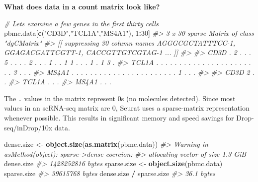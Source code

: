 \documentclass[
]{book}
\newenvironment{Shaded}{\begin{snugshade}}{\end{snugshade}}
\newcommand{\CommentTok}[1]{\textcolor[rgb]{0.56,0.35,0.01}{\textit{#1}}}
\newcommand{\DecValTok}[1]{\textcolor[rgb]{0.00,0.00,0.81}{#1}}
\newcommand{\FunctionTok}[1]{\textcolor[rgb]{0.13,0.29,0.53}{\textbf{#1}}}
\newcommand{\NormalTok}[1]{#1}
\newcommand{\OtherTok}[1]{\textcolor[rgb]{0.56,0.35,0.01}{#1}}
\newcommand{\SpecialCharTok}[1]{\textcolor[rgb]{0.81,0.36,0.00}{\textbf{#1}}}
\newcommand{\StringTok}[1]{\textcolor[rgb]{0.31,0.60,0.02}{#1}}
\begin{document}
\textbf{What does data in a count matrix look like?}

\begin{Shaded}
\begin{Highlighting}[]
\CommentTok{\# Lets examine a few genes in the first thirty cells}
\NormalTok{pbmc.data[}\FunctionTok{c}\NormalTok{(}\StringTok{"CD3D"}\NormalTok{,}\StringTok{"TCL1A"}\NormalTok{,}\StringTok{"MS4A1"}\NormalTok{), }\DecValTok{1}\SpecialCharTok{:}\DecValTok{30}\NormalTok{]}
\CommentTok{\#\textgreater{} 3 x 30 sparse Matrix of class "dgCMatrix"}
\CommentTok{\#\textgreater{}   [[ suppressing 30 column names \textquotesingle{}AGGGCGCTATTTCC{-}1\textquotesingle{}, \textquotesingle{}GGAGACGATTCGTT{-}1\textquotesingle{}, \textquotesingle{}CACCGTTGTCGTAG{-}1\textquotesingle{} ... ]]}
\CommentTok{\#\textgreater{}                                                            }
\CommentTok{\#\textgreater{} CD3D  . 2 . . . 5 . . . . 2 . . . 1 . . 1 1 . . . 1 . 1 3 .}
\CommentTok{\#\textgreater{} TCL1A . . . . . . . . . . . . . . . . . . . . . . . 3 . . .}
\CommentTok{\#\textgreater{} MS4A1 . . . . . . . . . . . . . . . . . . . . . . . 1 . . .}
\CommentTok{\#\textgreater{}            }
\CommentTok{\#\textgreater{} CD3D  2 . .}
\CommentTok{\#\textgreater{} TCL1A . . .}
\CommentTok{\#\textgreater{} MS4A1 . . .}
\end{Highlighting}
\end{Shaded}

The \texttt{.} values in the matrix represent 0s (no molecules detected). Since most values in an scRNA-seq matrix are 0, Seurat uses a sparse-matrix representation whenever possible. This results in significant memory and speed savings for Drop-seq/inDrop/10x data.

\begin{Shaded}
\begin{Highlighting}[]
\NormalTok{dense.size }\OtherTok{\textless{}{-}} \FunctionTok{object.size}\NormalTok{(}\FunctionTok{as.matrix}\NormalTok{(pbmc.data))}
\CommentTok{\#\textgreater{} Warning in asMethod(object): sparse{-}\textgreater{}dense coercion:}
\CommentTok{\#\textgreater{} allocating vector of size 1.3 GiB}
\NormalTok{dense.size}
\CommentTok{\#\textgreater{} 1428252816 bytes}
\NormalTok{sparse.size }\OtherTok{\textless{}{-}} \FunctionTok{object.size}\NormalTok{(pbmc.data)}
\NormalTok{sparse.size}
\CommentTok{\#\textgreater{} 39615768 bytes}
\NormalTok{dense.size }\SpecialCharTok{/}\NormalTok{ sparse.size}
\CommentTok{\#\textgreater{} 36.1 bytes}
\end{Highlighting}
\end{Shaded}
\end{document}
